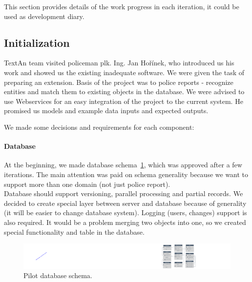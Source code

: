 This section provides details of the work progress in each iteration, it could be used as development diary.

\subsection{Initialization}
TextAn team visited policeman plk. Ing. Jan Hořínek, who introduced us his work and showed
us the existing inadequate software. We were given the task of preparing an extension. Basis of the
project was to police reports - recognize entities and match them
to existing objects in the database. We were advised to use Webservices for an easy integration of 
the project to the current system. He promised us models and
example data inputs and expected outputs. 

We made some decisions and requirements for each component:

\paragraph{Database}
At the beginning, we made database schema~\ref{fig:dbpilot}, which was approved  after a few
iterations. The main attention was paid on schema generality because we want to
support more than one domain (not just police report).\\
Database should support versioning, parallel processing and partial records. We
decided to create special layer between server and database because of
generality (it will be easier to change database system). Logging (users,
changes) support is also required. It would be a problem merging two objects into 
one, so we created special functionality and table in the
database.
\begin{figure}[!htb]
        \centering
        \includegraphics[width=\textwidth]{Images/db-pilot}
        \caption{Pilot database schema.}
        \label{fig:dbpilot}
\end{figure}

